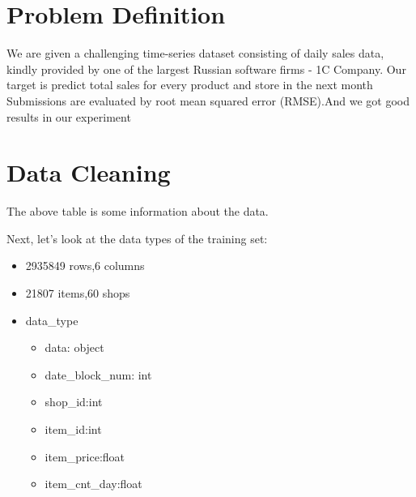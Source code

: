 \section{Problem Definition}
    We are given a challenging time-series dataset consisting of daily sales data, kindly provided by one of the largest Russian software firms - 1C Company.
    Our target is predict total sales for every product and store in the next month
    Submissions are evaluated by root mean squared error (RMSE).And we got good results in our experiment
\section{Data Cleaning}
\begin{table}[h]
    \begin{center}
    \end{center}
    \caption{Data Infomation}
  \end{table}
  The above table is some information about the data.\par
  Next, let's look at the data types of the training set:
  \begin{itemize}
    \item 2935849 rows,6 columns
    \item 21807 items,60 shops
    \item data_type
          \begin{itemize}
            \item data: object
            \item date_block_num: int
            \item shop_id:int
            \item item_id:int
            \item item_price:float
            \item item_cnt_day:float
          \end{itemize}
  \end{itemize}
